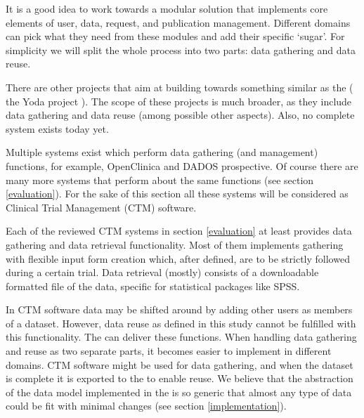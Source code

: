 It is a good idea to work towards a modular solution that implements core elements of user, data, request, and publication management.
Different domains can pick what they need from these modules and add their specific `sugar'.
For simplicity we will split the whole process into two parts: data gathering and data reuse.

There are other projects that aim at building towards something similar as the \ivfsystem{} (\eg{} the Yoda project \cite{yodaGithub, yodaPresentation}).
The scope of these projects is much broader, as they include data gathering and data reuse (among possible other aspects).
Also, no complete system exists today yet.

Multiple systems exist which perform data gathering (and management) functions, 
for example, OpenClinica and DADOS prospective.
Of course there are many more systems that perform about the same functions (see section \ref{evaluation}).
For the sake of this section all these systems will be considered as Clinical Trial Management (CTM) software.

Each of the reviewed CTM systems in section \ref{evaluation} at least provides data gathering and data retrieval functionality.
Most of them implements gathering with flexible input form creation which, after defined, are to be strictly followed during a certain trial.
Data retrieval (mostly) consists of a downloadable formatted file of the data, specific for statistical packages like SPSS.

In CTM software data may be shifted around by adding other users as members of a dataset.
However, data reuse as defined in this study cannot be fulfilled with this functionality.
The \ivfsystem{} can deliver these functions.
When handling data gathering and reuse as two separate parts, it becomes easier to implement in different domains.
CTM software might be used for data gathering, and when the dataset is complete it is exported to the \ivfsystem{} to enable reuse.
We believe that the abstraction of the data model implemented in the \ivfprototype{} is so generic that almost any type of data could be fit with minimal changes (see section \ref{implementation}).